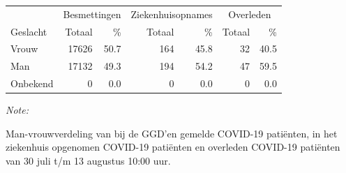 \documentclass[
  english,
  man,floatsintext]{apa6}
\begin{document}
\begin{table}
\centering\begingroup\fontsize{11}{13}\selectfont

\begin{threeparttable}
\begin{tabular}{lrrrrrr}
\toprule
\multicolumn{1}{c}{ } & \multicolumn{2}{c}{Besmettingen} & \multicolumn{2}{c}{Ziekenhuisopnames} & \multicolumn{2}{c}{Overleden} \\
\cmidrule(l{3pt}r{3pt}){2-3} \cmidrule(l{3pt}r{3pt}){4-5} \cmidrule(l{3pt}r{3pt}){6-7}
Geslacht & Totaal & \% & Totaal & \% & Totaal & \%\\
\midrule
Vrouw & 17626 & 50.7 & 164 & 45.8 & 32 & 40.5\\
Man & 17132 & 49.3 & 194 & 54.2 & 47 & 59.5\\
Onbekend & 0 & 0.0 & 0 & 0.0 & 0 & 0.0\\
\bottomrule
\end{tabular}
\begin{tablenotes}
\item \textit{Note: } 
\item Man-vrouwverdeling van bij de GGD’en gemelde COVID-19 patiënten, in het ziekenhuis opgenomen COVID-19 patiënten en overleden COVID-19 patiënten van 30 juli t/m 13 augustus 10:00 uur.
\end{tablenotes}
\end{threeparttable}
\endgroup{}
\end{table}
\newpage
\end{document}
